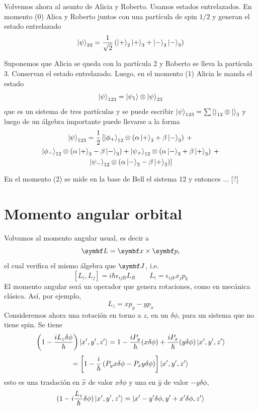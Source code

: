 \documentclass[10pt,oneside]{CBFT_book}
\begin{document}
Volvemos ahora al asunto de Alicia y Roberto.
Usamos estados entrelazados. En momento (0) Alica y Roberto juntos con una partícula de spin $1/2$
y generan el estado entrelazado
\[
	\Ket{\psi}_{23} = \frac{1}{\sqrt{2}}
	\left( \Ket{+}_2\Ket{+}_3 + \Ket{-}_2\Ket{-}_3 \right)
\]

Suponemos que Alicia se queda con la partícula 2 y Roberto se lleva la partícula 3.
Conservan el estado entrelazado. Luego, en el momento (1) Alicia le manda el estado
\[
	\Ket{\psi}_{123} = \Ket{\psi_1} \otimes \Ket{\psi}_{23}
\]
que es un sistema de tres partículas y se puede escribir $ \Ket{\psi}_{123} = 
\sum \Ket{}_{12} \otimes \Ket{}_{3} $ y luego de un álgebra importante puede llevarse
a la forma
\begin{multline*}
	\Ket{\psi}_{123} = \frac{1}{2}
	\left[ 
	\Ket{\phi_+}_{12} \otimes \left( \alpha \Ket{+}_3 + \beta \Ket{-}_3 \right) \: + \right.\\ 
	\Ket{\phi_-}_{12} \otimes \left( \alpha \Ket{+}_3 - \beta \Ket{-}_3 \right) +
	\Ket{\psi_+}_{12} \otimes \left( \alpha \Ket{-}_3 + \beta \Ket{+}_3 \right) \: + \\
	\left. \Ket{\psi_-}_{12} \otimes \left( \alpha \Ket{-}_3 - \beta \Ket{+}_3 \right)
	\right]
\end{multline*}

En el momento (2) se mide en la base de Bell el sistema 12 y entonces ... [?]

\section{Momento angular orbital}

Volvamos al momento angular usual, es decir a
\[
	\vb{L} = \vb{x} \times \vb{p},
\]
el cual verifica el mismo álgebra que $\vb{J}$, i.e.
\[
	[ L_i, L_j ] = i\hbar \epsilon_{ijR} L_R \qquad L_i = \epsilon_{ijk}x_jp_k
\]
El momento angular será un operador que genera rotaciones, como en mecánica clásica.
Así, por ejemplo,
\[
	L_z = xp_y - yp_x
\]
Consideremos ahora una rotación en torno a $z$, en un $\delta\phi$, para un sistema que no tiene
spin. Se tiene
\[
	\left( 1 - \frac{iL_z\delta\phi}{\hbar} \right) \Ket{x',y',z'} =
	1 - \frac{iP_y}{\hbar}(x\delta\phi) + \frac{iP_x}{\hbar}(y\delta\phi) \Ket{x',y',z'}
\]
\[
	= \left[ 1 - \frac{i}{\hbar}\left( P_y x\delta\phi - P_x y\delta\phi \right)\right] \Ket{x',y',z'}
\]
esto es una traslación en $\hat{x}$ de valor $x\delta\phi$ y una en $\hat{y}$ de valor $-y\delta\phi$,
\[
	(1-i\frac{L_z}{\hbar}\delta\phi) \Ket{x',y',z'} = \Ket{x'-y'\delta\phi,y'+x'\delta\phi,z'}
\]
\end{document}
